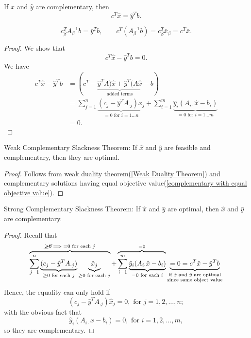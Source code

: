 \begin{theorem}
	\label{complementary with equal objective value}
	If \(\hat{x}\) and \(\hat{y}\) are complementary, then
	\[
		c^{T}\hat{x} = \hat{y}^{T} b.
	\]
\end{theorem}
\begin{note}
	\[
		c^{T}_{\beta} A^{-1}_{\beta}b = \overline{y}^{T} b,\qquad c^{T}(A^{-1}_{\beta} b) = c^{T}_{\beta}\overline{x}_{\beta} = c^{T}\overline{x}.
	\]
\end{note}
\begin{proof}
	We show that
	\[
		c^{T} \hat{x} - \hat{y}^{T} b = 0.
	\]
	We have
	\[
		\begin{split}
			c^{T} \hat{x} - \hat{y}^{T} b &= (c^{T} - \underbrace{\hat{y}^{T}A)\hat{x} + \hat{y}^{T}(A \hat{x}}_{\text{added terms}} - b)\\
			&=\sum\limits_{j=1}^{n} \underbrace{(c_{j}-\hat{y}^{T}A_{\cdot j})x_{j}}_{ = 0\text{ for }i = 1\ldots n}
			+ \sum\limits_{i=1}^{m} \underbrace{\hat{y}_i(A_{i\cdot}\hat{x} - b_{i})}_{ = 0\text{ for }i = 1\ldots m}\\
			&= 0.
		\end{split}
	\]
\end{proof}

\begin{theorem}
	\label{Weak Complementary Slackness}
	Weak Complementary Slackness Theorem: If \(\hat{x}\) and \(\hat{y}\) are feasible and complementary, then they are optimal.
\end{theorem}
\begin{proof}
	Follows from weak duality theorem(\autoref{Weak Duality Theorem}) and complementary solutions having equal objective value(\autoref{complementary with equal objective value}).
\end{proof}

\begin{theorem}
	\label{Strong Complementary Slackness}
	Strong Complementary Slackness Theorem: If \(\hat{x}\) and \(\hat{y}\) are optimal, then \(\hat{x}\) and \(\hat{y}\) are complementary.
\end{theorem}
\begin{proof}
	Recall that
	\[
		\overbrace{\sum\limits_{j=1}^{n} \underbrace{(c_{j}-\hat{y}^{T}A_{\cdot j})}_{ \geq 0\text{ for each }j}\underbrace{\hat{x}_{j}}_{\geq 0 \text{ for each }j}}^{\cancel{\geq 0}\implies = 0\text{ for each }j}
		+ \overbrace{\sum\limits_{i=1}^{m} \underbrace{\hat{y}_i(A_{i\cdot}\hat{x} - b_{i})}_{ = 0\text{ for each }i}}^{=0}
		\underbrace{= 0 = c^{T}\hat{x} - \hat{y}^{T}b}_{\substack{\text{if }\hat{x}\text{ and }\hat{y}\text{ are optimal}\\ \text{since same object value}}}
	\]
	Hence, the equality can only hold if
	\[
		(c_{j} - \hat{y}^{T}A_{\cdot j})\hat{x}_j = 0, \text{ for }j = 1, 2, \ldots , n;
	\]
	with the obvious fact that
	\[
		\hat{y}_i(A_{i\cdot}\hat{x} - b_{i}) = 0, \text{ for }i = 1, 2, \ldots , m,
	\]
	so they are complementary.
\end{proof}


